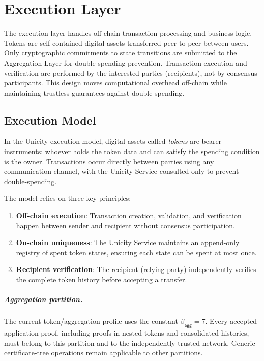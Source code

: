 \chapter{Execution Layer}

The execution layer handles off-chain transaction processing and business logic. Tokens are self-contained digital assets transferred peer-to-peer between users. Only cryptographic commitments to state transitions are submitted to the Aggregation Layer for double-spending prevention. Transaction execution and verification are performed by the interested parties (recipients), not by consensus participants. This design moves computational overhead off-chain while maintaining trustless guarantees against double-spending.

\section{Execution Model}

In the Unicity execution model, digital assets called \emph{tokens} are bearer instruments: whoever holds the token data and can satisfy the spending condition is the owner. Transactions occur directly between parties using any communication channel, with the Unicity Service consulted only to prevent double-spending.

The model relies on three key principles:
\begin{enumerate}
	\item \textbf{Off-chain execution}: Transaction creation, validation, and verification happen between sender and recipient without consensus participation.
	\item \textbf{On-chain uniqueness}: The Unicity Service maintains an append-only registry of spent token states, ensuring each state can be spent at most once.
	\item \textbf{Recipient verification}: The recipient (relying party) independently verifies the complete token history before accepting a transfer.
\end{enumerate}

\paragraph{Aggregation partition.}\label{sec:aggregation-profile}
The current token/aggregation profile uses the constant $\beta_{\mathsf{agg}}=7$. Every accepted application proof, including proofs in nested tokens and consolidated histories, must belong to this partition and to the independently trusted network. Generic certificate-tree operations remain applicable to other partitions.

